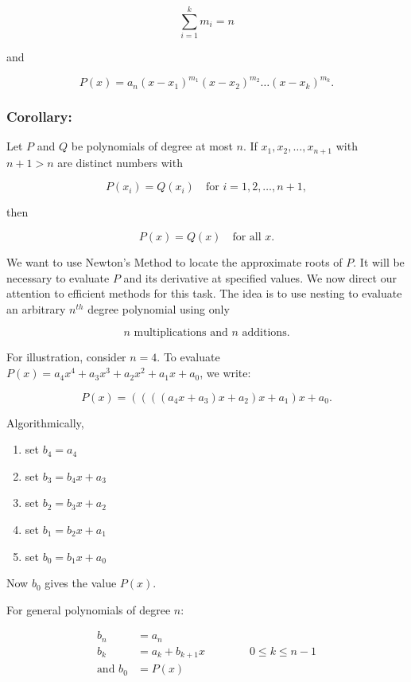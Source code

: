 \documentclass[12pt]{article}
\begin{document}
\[
  \sum_{i=1}^{k} m_i = n
\]

and 

\[
  P(x) = a_n (x - x_1)^{m_1} (x - x_2)^{m_2} \dots (x - x_k)^{m_k}.
\]

\subsubsection*{Corollary:}
Let \( P \) and \( Q \) be polynomials of degree at most \( n \). If \( x_1, x_2, \dots, x_{n+1} \) with \( n+1 > n \) are distinct numbers with 

\[
  P(x_i) = Q(x_i) \quad \text{for } i = 1,2, \dots, n+1,
\]

then 

\[
  P(x) = Q(x) \quad \text{for all } x.
\]

We want to use Newton's Method to locate the approximate roots of $P$. It will
be necessary to evaluate $P$ and its derivative at specified values. We now 
direct our attention to efficient methods for this task. The idea is to use 
nesting to evaluate an arbitrary $n^{th}$ degree polynomial using only

\[
  n \text{ multiplications and } n \text{ additions}
.\]

For illustration, consider $n=4$. To evaluate 
$P(x) = a_4x^4 + a_3x^3 + a_2x^2 + a_1x+a_0$, we write:

\[
  P(x) = \left(\left(\left(\left(a_4x+a_3\right)x+a_2\right)x+a_1\right)x+a_0
.\]

Algorithmically,

\begin{enumerate}
  \item set $b_4 = a_4$
  \item set $b_3 = b_4x + a_3$
  \item set $b_2 = b_3x + a_2$
  \item set $b_1 = b_2x + a_1$
  \item set $b_0 = b_1x + a_0$
\end{enumerate}

Now $b_0$ gives the value $P(x)$.

For general polynomials of degree $n:$

\begin{align*}
  b_n &= a_n \\
  b_k &= a_k+b_{k+1}x \qquad\qquad 0 \leq k \leq n-1 \\
  \text{and } b_0 &= P(x) \\
\end{align*}
\end{document}
